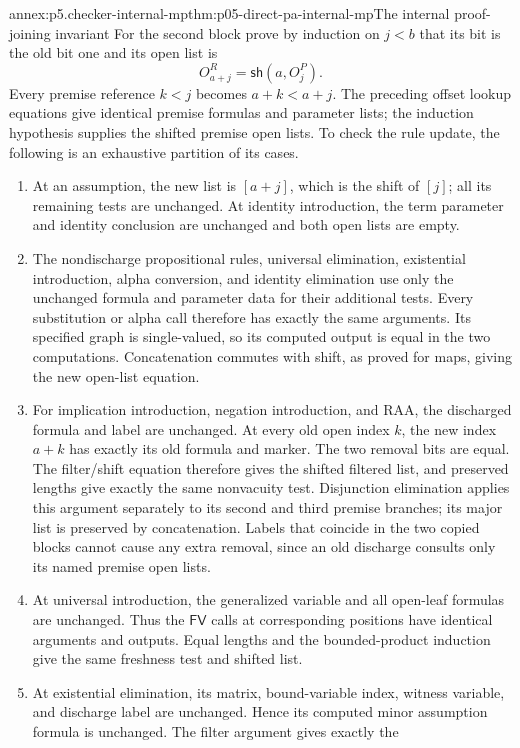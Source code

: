 \begin{annexitem}{annex:p5.checker-internal-mp}{thm:p05-direct-pa-internal-mp}{The internal proof-joining invariant}
For the second block prove by induction on \(j<b\) that its bit is the old
bit one and its open list is
\[
             O^{R}_{a+j}=\mathsf{sh}(a,O^{P}_j).
\]
Every premise reference \(k<j\) becomes \(a+k<a+j\).  The preceding
offset lookup equations give identical premise formulas and parameter lists;
the induction hypothesis supplies the shifted premise open lists.  To check
the rule update, the following is an exhaustive partition of its cases.
\begin{enumerate}
\item At an assumption, the new list is \([a+j]\), which is the shift
 of \([j]\); all its remaining tests are unchanged.  At identity
 introduction, the term parameter and identity conclusion are unchanged and
 both open lists are empty.
\item The nondischarge propositional rules, universal elimination,
 existential introduction, alpha conversion, and identity elimination use
 only the unchanged formula and parameter data for their additional tests.
 Every substitution or alpha call therefore has exactly the same arguments.
 Its specified graph is single-valued, so its computed output is equal in
 the two computations.  Concatenation commutes with shift, as proved for
 maps, giving the new open-list equation.
\item For implication introduction, negation introduction, and RAA, the
 discharged formula and label are unchanged.  At every old open index \(k\),
 the new index \(a+k\) has exactly its old formula and marker.  The two
 removal bits are equal.  The filter/shift equation therefore gives the
 shifted filtered list, and preserved lengths give exactly the same
 nonvacuity test.  Disjunction elimination applies this argument separately
 to its second and third premise branches; its major list is preserved by
 concatenation.  Labels that coincide in the two copied blocks cannot cause
 any extra removal, since an old discharge consults only its named premise
 open lists.
\item At universal introduction, the generalized variable and all open-leaf
 formulas are unchanged.  Thus the \(\mathsf{FV}\) calls at corresponding
 positions have identical arguments and outputs.  Equal lengths and the
 bounded-product induction give the same freshness test and shifted list.
\item At existential elimination, its matrix, bound-variable index, witness
 variable, and discharge label are unchanged.  Hence its computed minor
 assumption formula is unchanged.  The filter argument gives exactly the

\end{enumerate}
\end{annexitem}
